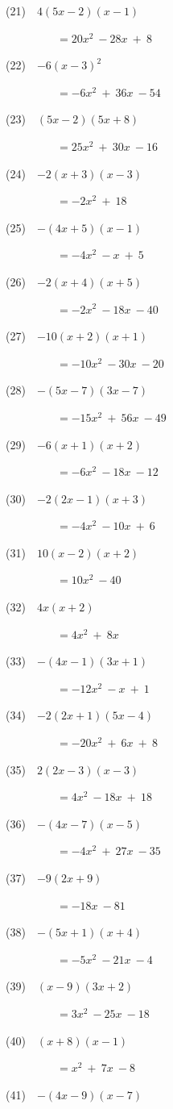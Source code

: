 \documentclass[a4j,twocolumn,10pt,fleqn]{jarticle}
\begin{document}
(21)~~$4(5x-2)(x-1)$

~~~~~~~~~$=20x^2~-28x~+~8$

(22)~~$-6(x-3)^2$

~~~~~~~~~$=-6x^2~+~36x~-54$

(23)~~$(5x-2)(5x+8)$

~~~~~~~~~$=25x^2~+~30x~-16$

(24)~~$-2(x+3)(x-3)$

~~~~~~~~~$=-2x^2~+~18$

(25)~~$-(4x+5)(x-1)$

~~~~~~~~~$=-4x^2~-x~+~5$

(26)~~$-2(x+4)(x+5)$

~~~~~~~~~$=-2x^2~-18x~-40$

(27)~~$-10(x+2)(x+1)$

~~~~~~~~~$=-10x^2~-30x~-20$

(28)~~$-(5x-7)(3x-7)$

~~~~~~~~~$=-15x^2~+~56x~-49$

(29)~~$-6(x+1)(x+2)$

~~~~~~~~~$=-6x^2~-18x~-12$

(30)~~$-2(2x-1)(x+3)$

~~~~~~~~~$=-4x^2~-10x~+~6$

(31)~~$10(x-2)(x+2)$

~~~~~~~~~$=10x^2~-40$

(32)~~$4x(x+2)$

~~~~~~~~~$=4x^2~+~8x$

(33)~~$-(4x-1)(3x+1)$

~~~~~~~~~$=-12x^2~-x~+~1$

(34)~~$-2(2x+1)(5x-4)$

~~~~~~~~~$=-20x^2~+~6x~+~8$

(35)~~$2(2x-3)(x-3)$

~~~~~~~~~$=4x^2~-18x~+~18$

(36)~~$-(4x-7)(x-5)$

~~~~~~~~~$=-4x^2~+~27x~-35$

(37)~~$-9(2x+9)$

~~~~~~~~~$=-18x~-81$

(38)~~$-(5x+1)(x+4)$

~~~~~~~~~$=-5x^2~-21x~-4$

(39)~~$(x-9)(3x+2)$

~~~~~~~~~$=3x^2~-25x~-18$

(40)~~$(x+8)(x-1)$

~~~~~~~~~$=x^2~+~7x~-8$

(41)~~$-(4x-9)(x-7)$
\end{document}
